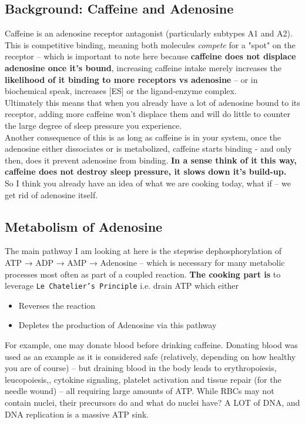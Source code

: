 \documentclass[11.5pt]{report}
\begin{document}
\subsection{Background: Caffeine and Adenosine}
Caffeine is an adenosine receptor antagonist (particularly subtypes A1 and A2). This is competitive binding, meaning both molecules \textit{compete} for a "spot" on the receptor -- which is important to note here because \textbf{caffeine does not displace adenosine once it's bound}, increasing caffeine intake merely increases the \textbf{likelihood of it binding to more receptors vs adenosine} -- or in biochemical speak, increases [ES] or the ligand-enzyme complex. \\
Ultimately this means that when you already have a lot of adenosine bound to its receptor, adding more caffeine won't displace them and will do little to counter the large degree of sleep pressure you experience. \\
Another consequence of this is as long as caffeine is in your system, once the adenosine either dissociates or is metabolized, caffeine starts binding - and only then, does it prevent adenosine from binding. \textbf{In a sense think of it this way, caffeine does not destroy sleep pressure, it slows down it's build-up.} \\
So I think you already have an idea of what we are cooking today, what if -- we get rid of adenosine itself. 

\subsection{Metabolism of Adenosine}
The main pathway I am looking at here is the stepwise dephosphorylation of ATP → ADP → AMP → Adenosine -- which is necessary for many metabolic processes most often as part of a coupled reaction. \textbf{The cooking part is} to leverage \texttt{Le Chatelier's Principle} i.e. drain ATP which either 
\begin{itemize}
	\item Reverses the reaction
	\item Depletes the production of Adenosine via this pathway
\end{itemize}
\noindent For example, one may donate blood before drinking caffeine. Donating blood was used as an example as it is considered safe (relatively, depending on how healthy you are of course) -- but draining blood in the body leads to erythropoiesis, leucopoiesis,, cytokine signaling, platelet activation and tissue repair (for the needle wound) -- all requiring large amounts of ATP. While RBCs may not contain nuclei, their precursors do and what do nuclei have? A LOT of DNA, and DNA replication is a massive ATP sink.  \\
\end{document}
